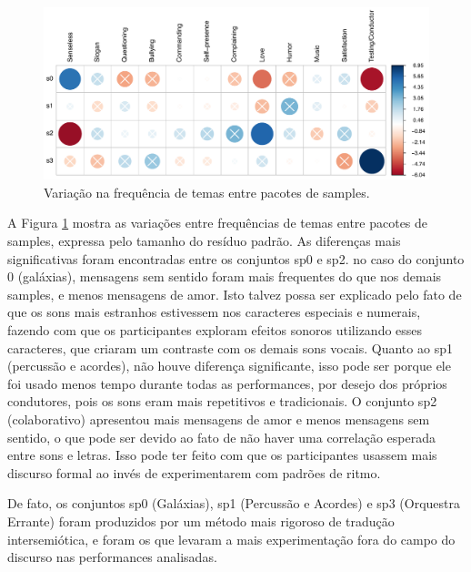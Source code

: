 \begin{figure}

\includegraphics[width=1\linewidth]{pictures/cap3/p_values}
\caption{Variação na frequência de temas entre pacotes de samples.}
\label{fig:bblplot2}
\end{figure}

A Figura \ref{fig:bblplot2} mostra as variações entre frequências de temas entre pacotes de samples, expressa pelo tamanho do resíduo padrão. As diferenças mais significativas foram encontradas entre os conjuntos sp0 e sp2. no caso do conjunto 0 (galáxias), mensagens sem sentido foram mais frequentes do que nos demais samples, e menos mensagens de amor. Isto talvez possa ser explicado pelo fato de que os sons mais estranhos estivessem nos caracteres especiais e numerais, fazendo com que os participantes exploram efeitos sonoros utilizando esses caracteres, que criaram um contraste com os demais sons vocais. Quanto ao sp1 (percussão e acordes), não houve diferença significante, isso pode ser porque ele foi usado menos tempo durante todas as performances, por desejo dos próprios condutores, pois os sons eram mais repetitivos e tradicionais. O conjunto sp2 (colaborativo) apresentou mais mensagens de amor e menos mensagens sem sentido, o que pode ser devido ao fato de não haver uma correlação esperada entre sons e letras. Isso pode ter feito com que os participantes usassem mais discurso formal ao invés de experimentarem com padrões de ritmo. 

De fato, os conjuntos sp0 (Galáxias), sp1 (Percussão e Acordes) e sp3 (Orquestra Errante) foram produzidos por um método mais rigoroso de tradução intersemiótica, e foram os que levaram a mais experimentação fora do campo do discurso nas performances analisadas. 


